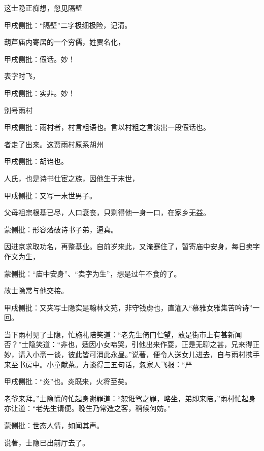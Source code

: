 \begin{parag}
    这士隐正痴想，忽见隔壁\begin{note}甲戌侧批：“隔壁”二字极细极险，记清。\end{note}葫芦庙内寄居的一个穷儒，姓贾名化，\begin{note}甲戌侧批：假话。妙！\end{note}表字时飞，\begin{note}甲戌侧批：实非。妙！\end{note}别号雨村\begin{note}甲戌侧批：雨村者，村言粗语也。言以村粗之言演出一段假话也。\end{note}者走了出来。这贾雨村原系胡州\begin{note}甲戌侧批：胡诌也。\end{note}人氏，也是诗书仕宦之族，因他生于末世，\begin{note}甲戌侧批：又写一末世男子。\end{note}父母祖宗根基已尽，人口衰丧，只剩得他一身一口，在家乡无益。\begin{note}蒙侧批：形容落破诗书子弟，逼真。\end{note}因进京求取功名，再整基业。自前岁来此，又淹蹇住了，暂寄庙中安身，每日卖字作文为生，\begin{note}蒙侧批：“庙中安身”、“卖字为生”，想是过午不食的了。\end{note}故士隐常与他交接。\begin{note}甲戌侧批：又夹写士隐实是翰林文苑，非守钱虏也，直灌入“慕雅女雅集苦吟诗”一回。\end{note}当下雨村见了士隐，忙施礼陪笑道：“老先生倚门伫望，敢是街市上有甚新闻否？”士隐笑道：“非也，适因小女啼哭，引他出来作耍，正是无聊之甚，兄来得正妙，请入小斋一谈，彼此皆可消此永昼。”说著，便令人送女儿进去，自与雨村携手来至书房中。小童献茶。方谈得三五句话，忽家人飞报：“严\begin{note}甲戌侧批：“炎”也。炎既来，火将至矣。\end{note}老爷来拜。”士隐慌的忙起身谢罪道：“恕诳驾之罪，略坐，弟即来陪。”雨村忙起身亦让道：“老先生请便。晚生乃常造之客，稍候何妨。”\begin{note}蒙侧批：世态人情，如闻其声。\end{note}说著，士隐已出前厅去了。
\end{parag}


